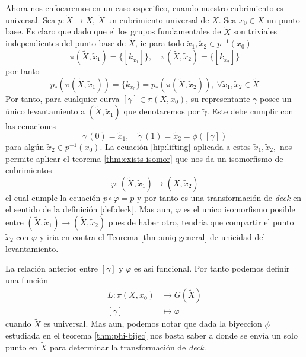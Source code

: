 Ahora nos enfocaremos en un caso especifico, cuando nuestro cubrimiento
es universal. Sea \(p : \tilde X \to X,\ \tilde X\) un
cubrimiento universal de \(X\). Sea \(x_0 \in X\) un punto base. Es
claro que dado que el los grupos fundamentales de \(\tilde X\) son
triviales independientes del punto base de \(\tilde X\), ie para todo
\(\tilde x_1, \tilde x_2 \in p^{-1} (x_0)\)
\begin{equation*}
  \pi \left( \tilde X , \tilde x_1 \right) = \{[k_{\tilde x_1}]\},\quad
  \pi \left( \tilde X , \tilde x_2 \right) = \{ [k_{\tilde x_2}]\}
\end{equation*}
por tanto
\begin{equation} \label{hip:lifting}
  p_* \left( \pi \left( \tilde X , \tilde x_1 \right) \right) =
  \{k_{x_0}\} = p_* \left( \pi \left( \tilde X , \tilde x_2 \right)
  \right),\ \forall \tilde x_1 , \tilde x_2 \in \tilde X
\end{equation}
Por tanto, para cualquier curva \([\gamma] \in \pi (X , x_0)\), su
representante \(\gamma\) posee un único levantamiento a \((\tilde X,
\tilde x_1)\) que denotaremos por \(\tilde \gamma\). Este debe cumplir
con las ecuaciones
\[ \tilde \gamma \, (0) = \tilde x_1, \quad \tilde \gamma \, (1) =
  \tilde x_2 = \phi ([\gamma]) \]
para algún \(\tilde x_2 \in p^{-1} (x_0)\). La ecuación
\eqref{hip:lifting} aplicada a estos \(\tilde x_1, \tilde x_2,\) nos
permite aplicar el teorema \ref{thm:exists-isomor} que nos da un
isomorfismo de cubrimientos
\[\varphi : (\tilde X , \tilde x_1) \to (\tilde X , \tilde x_2 ) \]
el cual cumple la ecuación \(p \circ \varphi = p\) y por tanto es una
transformación de \emph{deck} en el sentido de la definición
\ref{def:deck}. Mas aun, \(\varphi\) es el unico isomorfismo posible
entre \((\tilde X , \tilde x_1) \to (\tilde X , \tilde x_2 )\) pues de
haber otro, tendria que compartir el punto \(\tilde x_2\) con
\(\varphi\) y iria en contra el Teorema \ref{thm:uniq-general} de
unicidad del levantamiento.

La relación anterior entre \([\gamma]\) y \(\varphi\) es asi funcional.
Por tanto podemos definir una función
\begin{align}
  L : \pi (X, x_0) &\longrightarrow G (\tilde X) \label{def:L} \\
  [\gamma] &\longmapsto \varphi \nonumber
\end{align}
cuando \(\tilde X\) es universal. Mas aun, podemos notar que dada la
biyeccion \(\phi\) estudiada en el teorema \ref{thm:phi-bijec} nos basta
saber a donde se envía un solo punto en \(\tilde X\) para determinar la
transformación de \emph{deck}.

